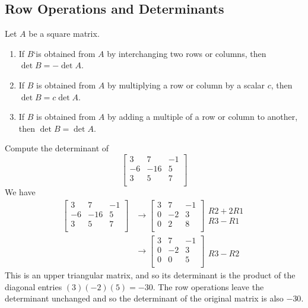 \documentclass{article}
\begin{document}
\subsection{Row Operations and Determinants}
\begin{theorem}
  Let $A$ be a square matrix.
  \begin{enumerate}
    \item If $B$`is obtained from $A$ by interchanging two rows or columns, then $\det B = -\det A$.
    \item If $B$ is obtained from $A$ by multiplying a row or column by a scalar $c$, then $\det B = c\det A$.
    \item If $B$ is obtained from $A$ by adding a multiple of a row or column to another, then $\det B = \det A$.
  \end{enumerate}
\end{theorem}
\begin{example}
  Compute the determinant of \[
    \begin{bmatrix}
      3  & 7   & -1 \\
      -6 & -16 & 5  \\
      3  & 5   & 7  \\
    \end{bmatrix}
  \]
  We have
  \begin{align*}
    \begin{bmatrix}
      3  & 7   & -1 \\
      -6 & -16 & 5  \\
      3  & 5   & 7  \\
    \end{bmatrix} & \to
    \begin{bmatrix}
      3 & 7  & -1 \\
      0 & -2 & 3  \\
      0 & 2  & 8  \\
    \end{bmatrix}
    \begin{matrix}
      \\
      R2 + 2R1 \\
      R3 - R1  \\
    \end{matrix}          \\
                     & \to
    \begin{bmatrix}
      3 & 7  & -1 \\
      0 & -2 & 3  \\
      0 & 0  & 5  \\
    \end{bmatrix}
    \begin{matrix}
      \\
      \\
      R3 - R2 \\
    \end{matrix}
  \end{align*}
  This is an upper triangular matrix, and so its determinant is the product of the diagonal entries $(3)(-2)(5) = -30$. The row operations leave the determinant unchanged and so the determinant of the original matrix is also $-30$.
\end{example}
\end{document}
